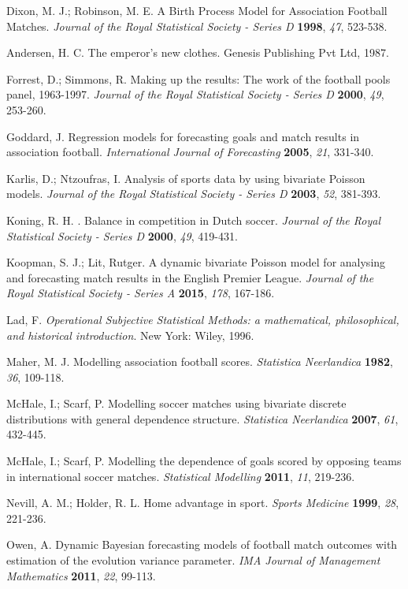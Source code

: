 \documentclass[journal,article,accept,moreauthors,pdftex,12pt,a4paper]{mdpi}
\begin{document}
\begin{thebibliography}{999}
 Dixon, M. J.; Robinson, M. E. A Birth Process Model for Association Football Matches. {\em Journal of the Royal Statistical Society - Series D}
{\bf 1998}, {\em 47}, 523-538.

Andersen, H.  C. The emperor's new clothes. Genesis Publishing Pvt Ltd, 1987.

 Forrest, D.; Simmons, R. Making up the results: The work
of the football pools panel, 1963-1997. {\em Journal of the Royal Statistical Society - Series D} {\bf 2000}, {\em 49}, 253-260.

Goddard, J. Regression models for forecasting goals and match
results in association football. {\em International Journal of
Forecasting} {\bf 2005}, {\em 21}, 331-340.

Karlis, D.; Ntzoufras, I. Analysis of sports data by using bivariate
Poisson models. {\em Journal of the Royal Statistical Society - Series D} {\bf 2003}, {\em 52}, 381-393.

Koning, R. H. . Balance in competition in Dutch soccer. {\em Journal of the Royal Statistical Society - Series D} {\bf 2000}, {\em 49}, 419-431.

Koopman, S. J.; Lit, Rutger. A dynamic bivariate Poisson model for
analysing and forecasting match results in the English Premier
League. {\em Journal of the Royal Statistical Society - Series A}
{\bf 2015}, {\em 178}, 167-186.

Lad, F. {\it Operational Subjective Statistical Methods: a mathematical,
philosophical, and historical introduction}. New York: Wiley, 1996.

Maher, M. J. Modelling association football scores. {\em Statistica Neerlandica} {\bf 1982}, {\em 36}, 109-118.

McHale, I.; Scarf, P. Modelling soccer matches using bivariate
discrete distributions with general dependence structure. {\em
Statistica Neerlandica} {\bf 2007}, {\em 61}, 432-445.

McHale, I.; Scarf, P. Modelling the dependence of goals scored by
opposing teams in international soccer matches. {\em Statistical
Modelling} {\bf 2011}, {\em 11}, 219-236.

Nevill, A. M.; Holder, R. L. Home advantage in sport. {\em Sports
Medicine} {\bf 1999}, {\em 28}, 221-236.

Owen, A. Dynamic Bayesian forecasting models of football match
outcomes with estimation of the evolution variance parameter. {\em
IMA Journal of Management Mathematics} {\bf 2011}, {\em 22}, 99-113.


\end{thebibliography}
\end{document}
